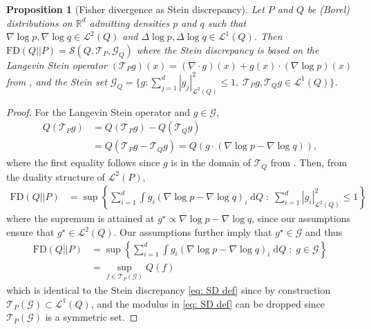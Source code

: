 \documentclass[12pt,paper=letter]{scrreprt}
\newtheorem{proposition}{Proposition}[chapter]
\begin{document}
\begin{proposition}[Fisher divergence as Stein discrepancy] \label{prop: fisher as stein}
    Let $P$ and $Q$ be (Borel) distributions on $\mathbb{R}^d$ admitting densities $p$ and $q$ such that $\nabla \log p , \nabla \log q \in \mathcal{L}^2(Q)$ and $\Delta \log p, \Delta \log q \in \mathcal{L}^1(Q)$.
    Then $\mathrm{FD}(Q||P) = \mathcal{S}(Q,\mathcal{T}_P,\mathcal{G}_Q)$ where the Stein discrepancy is based on the Langevin Stein operator $(\mathcal{T}_P g)(x) = (\nabla \cdot g)(x) + g(x) \cdot (\nabla \log p)(x)$ from , and the Stein set $\mathcal{G}_Q = \{g : \sum_{j=1}^d |g_j|_{\mathcal{L}^2(Q)}^2 \leq 1 , \; \mathcal{T}_Pg, \mathcal{T}_Q g \in \mathcal{L}^1(Q)\}$.
\end{proposition}
\begin{proof}
For the Langevin Stein operator and $g \in \mathcal{G}$,
\begin{align*}
    Q(\mathcal{T}_P g) 
    & = Q(\mathcal{T}_P g) - Q(\mathcal{T}_Q g) \\
    & = Q(\mathcal{T}_P g - \mathcal{T}_Q g)
    = Q( g \cdot (\nabla \log p - \nabla \log q) ) ,
\end{align*}
where the first equality follows since $g$ is in the domain of $\mathcal{T}_Q$ from .
Then, from the duality structure of $\mathcal{L}^2(P)$,
\begin{align*}
    \mathrm{FD}(Q||P) & = \sup \left\{ \sum_{i=1}^d \int g_i (\nabla \log p - \nabla \log q)_i \; \mathrm{d}Q \; : \; \sum_{i=1}^d |g_i|_{\mathcal{L}^2(Q)}^2 \leq 1 \right\} 
\end{align*}
where the supremum is attained at $g^\star \propto \nabla \log p - \nabla \log q$, since our assumptions ensure that $g^\star \in \mathcal{L}^2(Q)$.
Our assumptions further imply that $g^\star \in \mathcal{G}$ and thus
\begin{align*}    
    \mathrm{FD}(Q||P) & = \sup \left\{ \sum_{i=1}^d \int g_i (\nabla \log p - \nabla \log q)_i \; \mathrm{d}Q \; : \; g \in \mathcal{G} \right\} \\
    & = \sup_{f \in \mathcal{T}_P(\mathcal{G})} Q(f) 
\end{align*}
which is identical to the Stein discrepancy \eqref{eq: SD def} since by construction $\mathcal{T}_P (\mathcal{G}) \subset \mathcal{L}^1(Q)$, and the modulus in \eqref{eq: SD def} can be dropped since $\mathcal{T}_P (\mathcal{G})$ is a symmetric set.
\end{proof}
\end{document}
